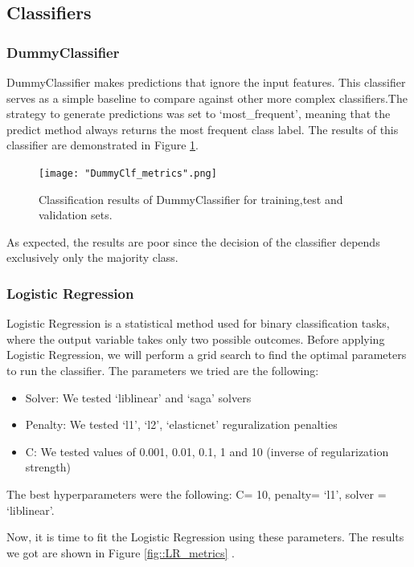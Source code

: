 \documentclass[10pt, a4paper]{article}
\begin{document}
    \subsection{Classifiers}
    \subsubsection{DummyClassifier}
    DummyClassifier makes predictions that ignore the input features. This classifier serves as a simple baseline to compare against other more complex classifiers.The strategy to generate predictions was set to ‘most\_frequent’,  meaning that the predict method always returns the most frequent class label. The results of this classifier are demonstrated in Figure \ref{fig::dummy_metrics}.

    \begin{figure}
	    \centering
            \texttt{[image: "DummyClf\_metrics".png]}
	    \caption{Classification results of DummyClassifier for training,test and validation sets.}
	    \label{fig::dummy_metrics}
    \end{figure}


    As expected, the results are poor since the decision of the classifier depends exclusively only the majority class.

    \subsubsection{Logistic Regression}
    Logistic Regression is a statistical method used for binary classification tasks, where the output variable takes only two possible outcomes.
    Before applying Logistic Regression, we will perform a grid search to find the optimal parameters to run the classifier. The parameters we tried are the following:
    \begin{itemize}
    \item{Solver: We tested ‘liblinear’ and ‘saga’ solvers}
    \item{Penalty: We tested ‘l1’, ‘l2’, ‘elasticnet’ reguralization penalties}
    \item{C: We tested values of 0.001, 0.01, 0.1, 1 and 10 (inverse of regularization strength)}
    \end{itemize}

    The best hyperparameters were the following:
    C= 10, penalty= ‘l1’, solver = ‘liblinear’.
    
    Now, it is time to fit the Logistic Regression using these parameters. The results we got are shown in Figure \ref{fig::LR_metrics} .
\end{document}
